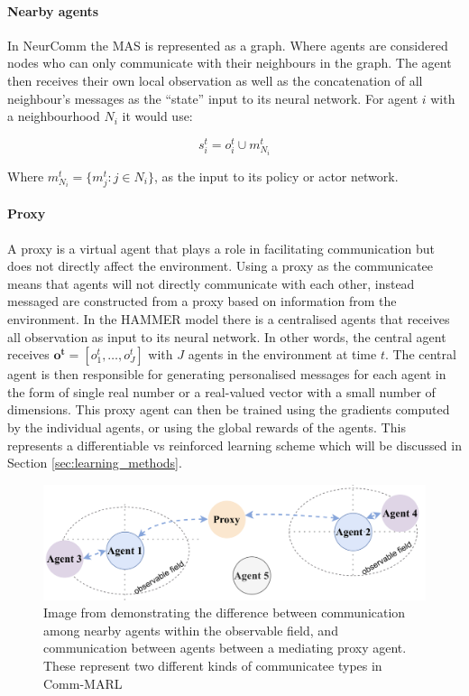 \documentclass{article}
\begin{document}
\paragraph{Nearby agents} In NeurComm \citep{chu2020NeurComm} the MAS is represented as a graph. Where agents are considered nodes who can only communicate with their neighbours in the graph. The agent then receives their own local observation as well as the concatenation of all neighbour's messages as the ``state'' input to its neural network. For agent $i$ with a neighbourhood $N_i$ it would use:

\begin{equation}
	s_i^t = o_i^t \cup m_{N_i}^t 
\end{equation}

Where $m_{N_i}^t = \{ m_j^t : j \in N_i \}$, as the input to its policy or actor network.

\paragraph{Proxy} A proxy is a virtual agent that plays a role in facilitating communication but does not directly affect the environment. Using a proxy as the communicatee means that agents will not directly communicate with each other, instead messaged are constructed from a proxy based on information from the environment. In the HAMMER model \citep{gupta2022HAMMER} there is a centralised agents that receives all observation as input to its neural network. In other words, the central agent receives $\mathbf{o^t} = [o^t_1, \hdots, o_J^t]$ with $J$ agents in the environment at time $t$. The central agent is then responsible for generating personalised messages for each agent in the form of single real number or a real-valued vector with a small number of dimensions. This proxy agent can then be trained using the gradients computed by the individual agents, or using the global rewards of the agents. This represents a differentiable vs reinforced learning scheme which will be discussed in Section \ref{sec:learning_methods}. 

\begin{figure}
	\centering
	\includegraphics[scale=0.5]{images/communicatee.png}
	\caption{Image from \citet{zhu2024survey} demonstrating the difference between communication among nearby agents within the observable field, and communication between agents between a mediating proxy agent. These represent two different kinds of communicatee types in Comm-MARL}
	\label{fig:communicatee}
\end{figure}
\end{document}
